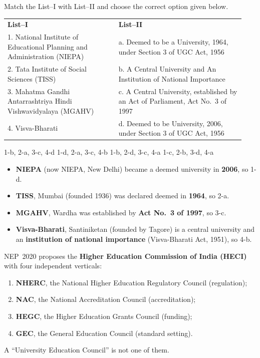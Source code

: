 Match the List--I with List--II and choose the correct option given below.\\[2pt]
\begin{tabular}{@{}p{0.44\linewidth}p{0.5\linewidth}@{}}
\textbf{List--I} & \textbf{List--II}\\
1. National Institute of Educational Planning and Administration (NIEPA) & a. Deemed to be a University, 1964, under Section 3 of UGC Act, 1956\\
2. Tata Institute of Social Sciences (TISS) & b. A Central University and An Institution of National Importance\\
3. Mahatma Gandhi Antarrashtriya Hindi Vishwavidyalaya (MGAHV) & c. A Central University, established by an Act of Parliament, Act No.~3 of 1997\\
4. Visva-Bharati & d. Deemed to be University, 2006, under Section 3 of UGC Act, 1956\\
\end{tabular}

1-b, 2-a, 3-c, 4-d
1-d, 2-a, 3-c, 4-b
1-b, 2-d, 3-c, 4-a
1-c, 2-b, 3-d, 4-a

\begin{itemize}
\item \textbf{NIEPA} (now NIEPA, New Delhi) became a deemed university in \textbf{2006}, so 1-d.
\item \textbf{TISS}, Mumbai (founded 1936) was declared deemed in \textbf{1964}, so 2-a.
\item \textbf{MGAHV}, Wardha was established by \textbf{Act No.~3 of 1997}, so 3-c.
\item \textbf{Visva-Bharati}, Santiniketan (founded by Tagore) is a central university and an \textbf{institution of national importance} (Visva-Bharati Act, 1951), so 4-b.
\end{itemize}

NEP~2020 proposes the \textbf{Higher Education Commission of India (HECI)} with four independent verticals:
\begin{enumerate}
\item \textbf{NHERC}, the National Higher Education Regulatory Council (regulation);
\item \textbf{NAC}, the National Accreditation Council (accreditation);
\item \textbf{HEGC}, the Higher Education Grants Council (funding);
\item \textbf{GEC}, the General Education Council (standard setting).
\end{enumerate}
A ``University Education Council'' is not one of them.

